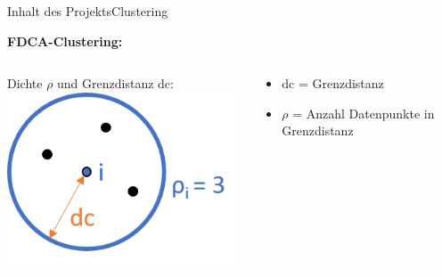 \documentclass[12pt, xcolor={usenames,dvipsnames,svgnames,x11names,table}]{beamer}
\begin{document}
	
	\begin{frame}{Inhalt des Projekts}{Clustering}
	
		\textbf{FDCA-Clustering:}
		\\\bigskip
		\begin{columns}[c, onlytextwidth]
			\begin{column}{.45\textwidth}
				Dichte $\rho$ und Grenzdistanz dc:\\
				\bigskip
				\includegraphics[scale=.9]{dc_dichte}
			\end{column}
			
			\begin{column}{.55\textwidth}
				\begin{itemize}
					\item dc = Grenzdistanz
					\item $\rho$ = Anzahl Datenpunkte in Grenzdistanz
				\end{itemize}
			\end{column}
		\end{columns}
		
	\end{frame}
	
\end{document}
